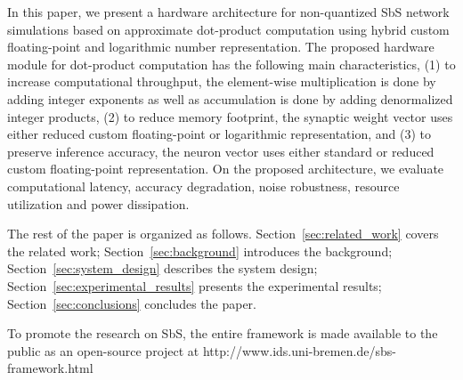 In this paper, we present a hardware architecture for non-quantized SbS network simulations based on approximate dot-product computation using hybrid custom floating-point and logarithmic number representation. The proposed hardware module for dot-product computation has the following main characteristics, (1) to increase computational throughput, the element-wise multiplication is done by adding integer exponents as well as accumulation is done by adding denormalized integer products, (2) to reduce memory footprint, the synaptic weight vector uses either reduced custom floating-point or logarithmic representation, and (3) to preserve inference accuracy, the neuron vector uses either standard or reduced custom floating-point representation. On the proposed architecture, we evaluate computational latency, accuracy degradation, noise robustness, resource utilization and power dissipation.

The rest of the paper is organized as follows. Section~\ref{sec:related_work} covers the related work; Section~\ref{sec:background} introduces the background; Section~\ref{sec:system_design} describes the system design; Section~\ref{sec:experimental_results} presents the experimental results; Section~\ref{sec:conclusions} concludes the paper.


To promote the research on SbS, the entire framework is made available to the public as an open-source project at http://www.ids.uni-bremen.de/sbs-framework.html

